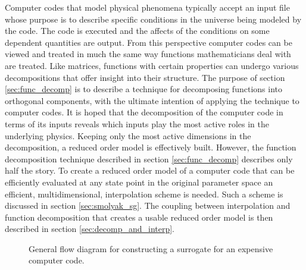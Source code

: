 Computer codes that model physical phenomena typically accept an input file whose purpose is to describe specific conditions in the universe being modeled by the code. The code is executed and the affects of the conditions on some dependent quantities are output. From this perspective computer codes can be viewed and treated in much the same way functions mathematicians deal with are treated. Like matrices, functions with certain properties can undergo various decompositions that offer insight into their structure. The purpose of section \ref{sec:func_decomp} is to describe a technique for decomposing functions into orthogonal components, with the ultimate intention of applying the technique to computer codes. It is hoped that the decomposition of the computer code in terms of its inputs reveals which inputs play the most active roles in the underlying physics. Keeping only the most active dimensions in the decomposition, a reduced order model is effectively built. However, the function decomposition technique described in section \ref{sec:func_decomp} describes only half the story. To create a reduced order model of a computer code that can be efficiently evaluated at any state point in the original parameter space an efficient, multidimensional, interpolation scheme is needed. Such a scheme is discussed in section \ref{sec:smolyak_sg}. The coupling between interpolation and function decomposition that creates a usable reduced order model is then described in section \ref{sec:decomp_and_interp}.    
\begin{figure}
\caption{\label{fig:surrogate_process}
General flow diagram for constructing a surrogate for an expensive computer code.}
\end{figure}






